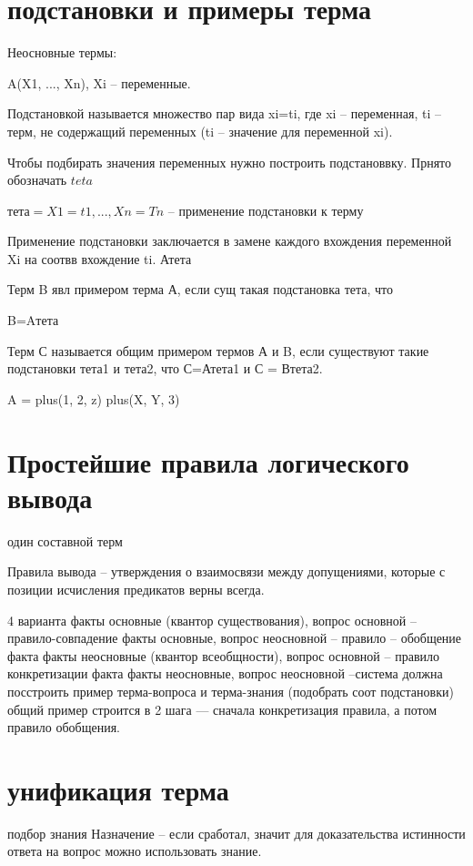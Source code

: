 \documentclass[12pt]{report}
\begin{document}
\section*{подстановки и примеры терма}

Неосновные термы:

A(X1, ..., Xn), Xi -- переменные.

Подстановкой называется множество пар  вида {xi=ti}, где xi -- переменная, ti  -- терм, не содержащий переменных (ti -- значение для переменной xi).

Чтобы подбирать значения переменных нужно построить подстановвку. Прнято обозначать $teta$


$тета = {X1=t1, ..., Xn=Tn}$ -- применение подстановки к терму


Применение подстановки заключается в замене каждого вхождения переменной Xi на соотвв вхождение ti. Атета

Терм B явл примером терма А, если сущ такая подстановка тета, что 

B=Aтета


Терм С называется общим примером термов А и B, если существуют такие подстановки тета1 и тета2, что С=Атета1 и С = Втета2.


A = plus(1, 2, z)
plus(X, Y, 3)




\section{Простейшие правила логического вывода}

один составной терм

Правила вывода -- утверждения о взаимосвязи между допущениями, которые с позиции исчисления предикатов верны всегда.

4 варианта
факты основные (квантор существования), вопрос основной -- правило-совпадение
факты основные, вопрос неосновной -- правило -- обобщение факта
факты неосновные (квантор всеобщности), вопрос основной -- правило конкретизации факта
факты неосновные, вопрос неосновной --система должна посстроить пример терма-вопроса и терма-знания (подобрать соот подстановки) общий пример строится в 2 шага --- сначала конкретизация правила, а потом правило обобщения.

\section*{унификация терма}

подбор  знания
Назначение -- если сработал, значит для доказательства истинности ответа на вопрос можно использовать знание.
\end{document}
